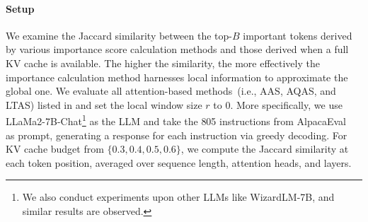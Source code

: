 \paragraph{Setup} We examine the Jaccard similarity between the top-$B$ important tokens 
derived by various importance score calculation methods and those derived when a full 
KV cache is available. The higher the similarity, the more effectively the importance 
calculation method harnesses local information to approximate the global one. We evaluate all 
attention-based methods~(i.e., AAS, AQAS, and LTAS) listed in  and set 
the local window size $r$ to 0. More specifically, we use LLaMa2-7B-Chat\footnote{We also 
conduct experiments upon other LLMs like WizardLM-7B, and similar results are observed.} as the LLM and take the 805 instructions from AlpacaEval~\cite{alpaca_eval} as prompt, generating a response for each instruction via greedy decoding. For KV cache budget from $\{0.3,0.4,0.5,0.6\}$, we compute the Jaccard similarity at each token position, averaged over sequence length, attention heads, and layers. 


